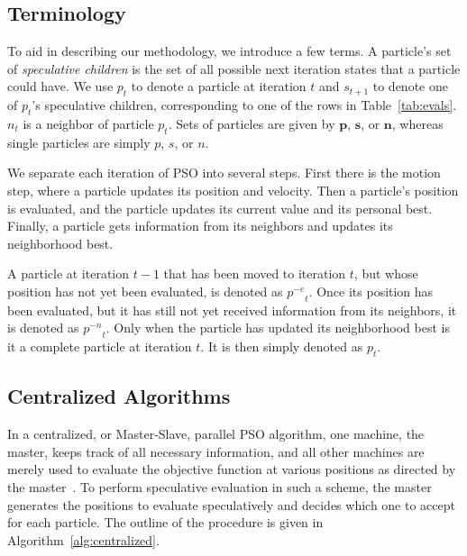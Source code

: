 \documentclass[journal,letterpaper]{IEEEtran}
\newcommand{\alg}[1]{Algorithm~\ref{alg:#1}}
\providecommand{\noeval}[1]{\ensuremath{#1^{-e}}}
\providecommand{\nonbest}[1]{\ensuremath{#1^{-n}}}
\providecommand{\p}{\ensuremath{p}}
\providecommand{\pset}{\ensuremath{\mathbf{p}}}
\providecommand{\s}{\ensuremath{s}}
\providecommand{\sset}{\ensuremath{\mathbf{s}}}
\providecommand{\n}{\ensuremath{n}}
\providecommand{\nset}{\ensuremath{\mathbf{n}}}
\begin{document}
\subsection{Terminology}

To aid in describing our methodology, we introduce a few terms.  A particle's
set of \emph{speculative children} is the set of all possible next iteration
states that a particle could have.  We use $\p_t$ to denote a particle at
iteration $t$ and $\s_{t+1}$ to denote one of $\p_t$'s speculative children,
corresponding to one of the rows in Table~\ref{tab:evals}.  $\n_t$ is a
neighbor of particle $\p_t$.  Sets of particles are given by $\pset$, $\sset$,
or $\nset$, whereas single particles are simply $\p$, $\s$, or $\n$.

We separate each iteration of PSO into several steps.  First there is the
motion step, where a particle updates its position and velocity.  Then a
particle's position is evaluated, and the particle updates its current value
and its personal best.  Finally, a particle gets information from its neighbors
and updates its neighborhood best.

A particle at iteration $t-1$ that has been moved to iteration $t$, but whose
position has not yet been evaluated, is denoted as $\noeval{\p}_t$.  Once its
position has been evaluated, but it has still not yet received information from
its neighbors, it is denoted as $\nonbest{\p}_t$.  Only when the particle has
updated its neighborhood best is it a complete particle at iteration $t$.  It is
then simply denoted as $\p_t$.

\subsection{Centralized Algorithms}

In a centralized, or Master-Slave, parallel PSO algorithm, one machine, the
master, keeps track of all necessary information, and all other machines are
merely used to evaluate the objective function at various positions as directed
by the master~\cite{belal-ijicis04}.  To perform speculative evaluation in such
a scheme, the master generates the positions to evaluate speculatively and
decides which one to accept for each particle.  The outline of the procedure is
given in \alg{centralized}.
\end{document}
